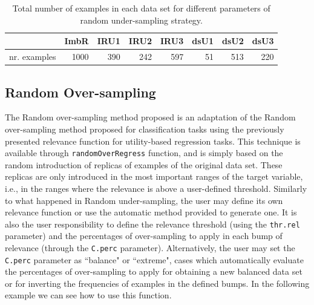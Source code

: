 \documentclass[10pt,a4paper]{article}\usepackage[]{graphicx}\usepackage[]{color}
\begin{document}
\begin{table}[ht]
\centering
\begin{tabular}{rrrrrrrr}
  \hline
 & ImbR & IRU1 & IRU2 & IRU3 & dsU1 & dsU2 & dsU3 \\ 
  \hline
nr. examples & 1000 & 390 & 242 & 597 &  51 & 513 & 220 \\ 
   \hline
\end{tabular}
\caption{Total number of examples in each data set for different parameters of random under-sampling strategy.} 
\label{tab:RUReg_table}
\end{table}




\subsection{Random Over-sampling}\label{sec:RORegress}

The Random over-sampling method proposed is an adaptation of the Random over-sampling method proposed for classification tasks using the previously presented relevance function for utility-based regression tasks. This technique is available through \texttt{randomOverRegress} function, and is simply based on the random introduction of replicas of examples of the original data set. These replicas are only introduced in the most important ranges of the target variable, i.e., in the ranges where the relevance is above a user-defined threshold. Similarly to what happened in Random under-sampling, the user may define its own relevance function or use the automatic method provided to generate one. It is also the user responsibility to define the relevance threshold (using the \texttt{thr.rel} parameter) and the percentages of over-sampling to apply in each bump of relevance (through the \texttt{C.perc} parameter). Alternatively, the user may set the \texttt{C.perc} parameter as ``balance" or ``extreme", cases which automatically evaluate the percentages of over-sampling to apply for obtaining a new balanced data set or for inverting the frequencies of examples in the defined bumps.
In the following example we can see how to use this function.
\end{document}
